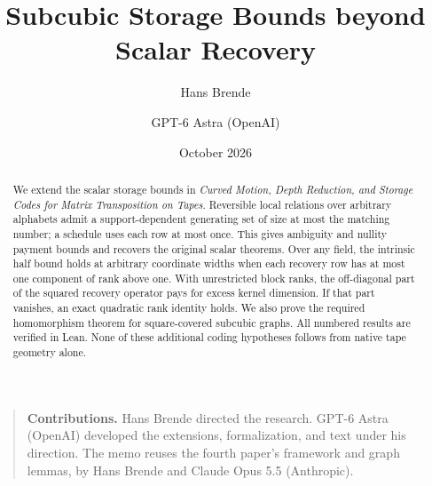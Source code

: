 \documentclass[11pt]{article}
\title{Subcubic Storage Bounds beyond Scalar Recovery}
\author{Hans Brende \and GPT-6 Astra (OpenAI)}
\date{October 2026}
\numberwithin{equation}{section}
\begin{document}
\maketitle
\begin{abstract}
We extend the scalar storage bounds in \emph{Curved Motion, Depth Reduction,
and Storage Codes for Matrix Transposition on Tapes}. Reversible local
relations over arbitrary alphabets admit a support-dependent generating set
of size at most the matching number; a schedule uses each row at most once.
This gives ambiguity and nullity payment bounds and recovers the original
scalar theorems. Over any field, the intrinsic half bound holds at arbitrary
coordinate widths when each recovery row has at most one component of rank
above one. With unrestricted block ranks, the off-diagonal part of the
squared recovery operator pays for excess kernel dimension. If that part
vanishes, an exact quadratic rank identity holds. We also prove the required
homomorphism theorem for square-covered subcubic graphs. All numbered
results are verified in Lean. None of these additional coding hypotheses
follows from native tape geometry alone.
\end{abstract}
\begin{quote}\small
\textbf{Contributions.} Hans Brende directed the research. GPT-6 Astra
(OpenAI) developed the extensions, formalization, and text under his
direction. The memo reuses the fourth paper's framework and graph lemmas,
by Hans Brende and Claude Opus 5.5 (Anthropic).
\end{quote}
\tableofcontents







\clearpage
\appendix




\end{document}
